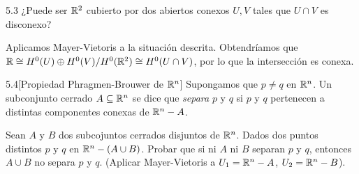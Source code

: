 \documentclass[twoside]{article}
\begin{document}
\begin{ejercicio}{5.3}
¿Puede ser $\mathbb{R}^2$ cubierto por dos abiertos conexos $U,V$ tales que $U\cap V$ es disconexo? 
\end{ejercicio}
\begin{solucion}
Aplicamos Mayer-Vietoris a la situación descrita. Obtendríamos que $\mathbb{R}\cong H^0(U)\oplus H^0(V)/H^0(\mathbb{R}^2)\cong H^0(U\cap V)$, por lo que la intersección es conexa.
\end{solucion}
\newpage

\begin{ejercicio}{5.4}[Propiedad Phragmen-Brouwer de $\mathbb{R}^n$]  Supongamos que $p\neq q$ en $\mathbb{R}^n$. Un subconjunto cerrado $A\subseteq\mathbb{R}^n$ se dice que \emph{separa} $p$ y $q$ si $p$ y $q$ pertenecen a distintas componentes conexas de $\mathbb{R}^n-A$. 

Sean $A$ y $B$ dos subcojuntos cerrados disjuntos de $\mathbb{R}^n$. Dados dos puntos distintos $p$ y $q$ en $\mathbb{R}^n-(A\cup B)$. Probar que si ni $A$ ni $B$ separan $p$ y $q$, entonces $A\cup B$ no separa $p$ y $q$. (Aplicar Mayer-Vietoris a $U_1=\mathbb{R}^n-A$, $U_2=\mathbb{R}^n-B$).

\end{ejercicio}
\end{document}

